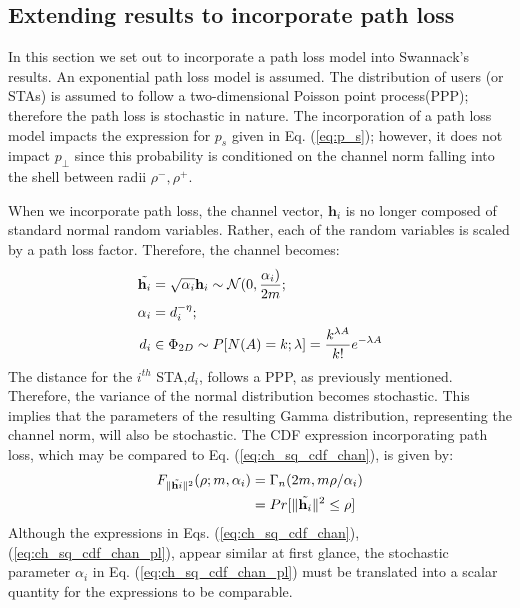 \subsection{Extending results to incorporate path loss}
In this section we set out to incorporate a path loss model into Swannack's results. An exponential path loss model is assumed. The distribution of users (or STAs) is assumed to follow a two-dimensional Poisson point process(PPP); therefore the path loss is stochastic in nature. The incorporation of a path loss model impacts the expression for $p_s$ given in Eq. (\ref{eq:p_s}); however, it does not impact $p_\perp$ since this probability is conditioned on the channel norm falling into the shell between radii $\rho^-,\rho^+$.

When we incorporate path loss, the channel vector, $\textbf{h}_i$ is no longer composed of standard normal random variables. Rather, each of the random variables is scaled by a path loss factor. Therefore, the channel becomes:
\begin{equation}\label{eq:pl_channel}
    \begin{aligned}
        \Tilde{\bold{h}_i} &= \sqrt{\alpha_i}\textbf{h}_i \sim\mathcal{N}(0,\frac{\alpha_i)}{2m};\\
        \alpha_i &= d_i^{-\eta};\\
        d_i &\in \Phi_{2D} \sim P[N(A)=k;\lambda] = \frac{k^{\lambda A}}{k!}e^{-\lambda A}
    \end{aligned}
\end{equation}
The distance for the $i^{th}$ STA,$d_i$, follows a PPP, as previously mentioned. Therefore, the variance of the normal distribution becomes stochastic. This implies that the parameters of the resulting Gamma distribution, representing the channel norm, will also be stochastic. The CDF expression incorporating path loss, which may be compared to Eq. (\ref{eq:ch_sq_cdf_chan}), is given by:
\begin{equation}\label{eq:ch_sq_cdf_chan_pl}
    \begin{aligned}
        F_{\Vert\Tilde{\bold{h}i}\Vert^2}(\rho;m,\alpha_i)& = \Gamma_n(2m,m\rho/\alpha_i)\\
        &= Pr[\Vert\Tilde{\bold{h}_i}\Vert^2 \leq \rho]
    \end{aligned}
\end{equation}
Although the expressions in Eqs. (\ref{eq:ch_sq_cdf_chan}),(\ref{eq:ch_sq_cdf_chan_pl}), appear similar at first glance, the stochastic parameter $\alpha_i$ in Eq. (\ref{eq:ch_sq_cdf_chan_pl}) must be translated into a scalar quantity for the expressions to be comparable.

